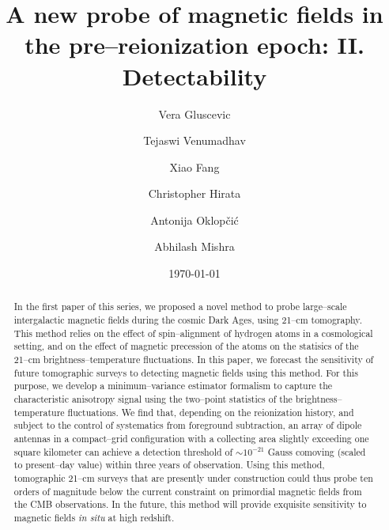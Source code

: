 \documentclass[aps,prd,twocolumn,floatfix,showpacs,superscriptaddress,nofootinbib]{revtex4-1}
\begin{document}
\widetext    
\title{A new probe of magnetic fields in the pre--reionization epoch: II. Detectability}
\author{Vera Gluscevic}
\author{Tejaswi Venumadhav}
\author{Xiao Fang}
\author{Christopher Hirata}
\author{Antonija Oklop\v ci\' c}
\author{Abhilash Mishra} 
\date{\today}  
    
 
\begin{abstract} 
In the first paper of this series, we proposed a novel method to probe large--scale intergalactic magnetic fields during the cosmic Dark Ages, using 21--cm tomography. This method relies on the effect of spin--alignment of hydrogen atoms in a cosmological setting, and on the effect of magnetic precession of the atoms on the statisics of the 21--cm brightness--temperature fluctuations. In this paper, we forecast the sensitivity of future tomographic surveys to detecting magnetic fields using this method. For this purpose, we develop a minimum--variance estimator formalism to capture the characteristic anisotropy signal using the two--point statistics of the brightness--temperature fluctuations. We find that, depending on the reionization history, and subject to the control of systematics from foreground subtraction, an array of dipole antennas in a compact--grid configuration with a collecting area slightly exceeding one square kilometer can achieve a detection threshold of $\sim 10^{-21}$ Gauss comoving (scaled to present--day value) within three years of observation. Using this method, tomographic 21--cm surveys that are presently under construction could thus probe ten orders of magnitude below the current constraint on primordial magnetic fields from the CMB observations. In the future, this method will provide exquisite sensitivity to magnetic fields \textit{in situ} at high redshift. 
\end{abstract} 
        
\pacs{} 
\maketitle  


\vspace{-12pt}





  
\appendix 

\label{app:Vrms} 

\label{app:lensing}
\vspace{-10pt}

\label{app:fesc}



\end{document}
